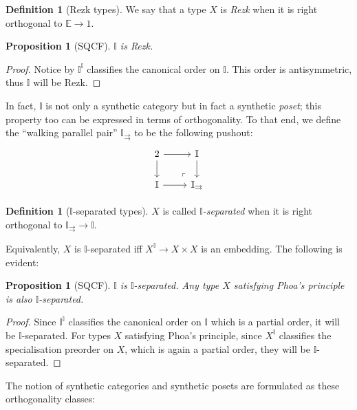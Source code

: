 \documentclass[a4paper,12pt]{amsart}
\newtheorem{proposition}[theorem]{Proposition}
\theoremstyle{definition}
\newtheorem{definition}[theorem]{Definition}
\newcommand{\mbb}[1]{\mathbb{#1}}
\newcommand{\I}{\mbb I}
\begin{document}
\begin{definition}[Rezk types]
  We say that a type $X$ is \emph{Rezk} when it is right orthogonal to $\mbb E \to 1$.
\end{definition}

\begin{proposition}[SQCF]
  $\I$ is Rezk.
\end{proposition}
\begin{proof}
  Notice by  $\I^\I$ classifies the canonical order on $\I$. This order is antisymmetric, thus $\I$ will be Rezk.
\end{proof}

In fact, $\I$ is not only a synthetic category but in fact a synthetic \emph{poset}; this property too can be expressed in terms of orthogonality. To that end, we define the ``walking parallel pair'' $\I_{\rightrightarrows}$ to be the following pushout:
\[
\begin{tikzcd}
  2 \ar[r] \ar[d] & \I \ar[d] \\ 
  \I \ar[r] & \I_{\rightrightarrows}
  \arrow["\lrcorner"{anchor=center, pos=0.125, rotate=180}, draw=none, from=2-2, to=1-1]
\end{tikzcd}
\]

\begin{definition}[$\I$-separated types]
  $X$ is called \emph{$\I$-separated} when it is right orthogonal to $\I_{\rightrightarrows} \to \I$.
\end{definition}

Equivalently, $X$ is $\I$-separated iff $X^\I \to X \times X$ is an embedding. The following is evident:

\begin{proposition}[SQCF]
  $\I$ is $\I$-separated. Any type $X$ satisfying Phoa's principle is also $\I$-separated.
\end{proposition}
\begin{proof}
  Since $\I^\I$ classifies the canonical order on $\I$ which is a partial order, it will be $\I$-separated. For types $X$ satisfying Phoa's principle, since $X^\I$ classifies the specialisation preorder on $X$, which is again a partial order, they will be $\I$-separated.
\end{proof}

The notion of synthetic categories and synthetic posets are formulated as these orthogonality classes:

\end{document}
